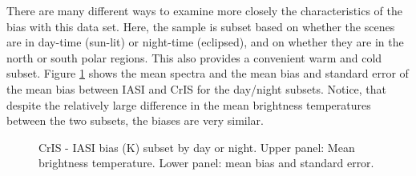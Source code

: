 \documentclass[twocolumn,10pt]{article}
\begin{document}
There are many different ways to examine more closely the characteristics of the bias with this data set. Here, the sample is subset based on whether the scenes are in day-time (sun-lit) or night-time (eclipsed), and on whether they are in the north or south polar regions. This also provides a convenient warm and cold subset. Figure \ref{fig:X5} shows the mean spectra and the mean bias and standard error of the mean bias between IASI and CrIS for the day/night subsets. Notice, that despite the
relatively large difference in the mean brightness temperatures between the two subsets, the biases are very similar.




\begin{figure}[htb]
    \centering
    \caption{CrIS - IASI bias (K) subset by day or night. Upper panel: Mean brightness temperature. Lower panel: mean bias and standard error.}%
    \label{fig:X5}%
\end{figure}
\end{document}
